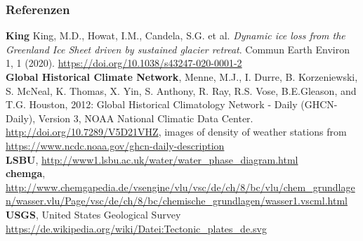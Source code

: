 \begin{frame}
	\frametitle{Referenzen}
	\small{
	\textbf{King} King, M.D., Howat, I.M., Candela, S.G. et al. \textit{Dynamic ice loss from the Greenland Ice Sheet driven by sustained glacier retreat}. Commun Earth Environ 1, 1 (2020). \url{https://doi.org/10.1038/s43247-020-0001-2}\\
	\textbf{Global Historical Climate Network}, Menne, M.J., I. Durre, B. Korzeniewski, S. McNeal, K. Thomas, X. Yin, S. Anthony, R. Ray, R.S. Vose, B.E.Gleason, and T.G. Houston, 2012: Global Historical Climatology Network - Daily (GHCN-Daily), Version 3, NOAA National Climatic Data Center. \url{http://doi.org/10.7289/V5D21VHZ}, images of density of weather stations from \url{https://www.ncdc.noaa.gov/ghcn-daily-description}\\
	\textbf{LSBU}, \url{http://www1.lsbu.ac.uk/water/water_phase_diagram.html}\\
	\textbf{chemga}, \url{http://www.chemgapedia.de/vsengine/vlu/vsc/de/ch/8/bc/vlu/chem_grundlagen/wasser.vlu/Page/vsc/de/ch/8/bc/chemische_grundlagen/wasser1.vscml.html}\\
	\textbf{USGS}, United States Geological Survey \url{https://de.wikipedia.org/wiki/Datei:Tectonic_plates_de.svg}
	}
\end{frame}
